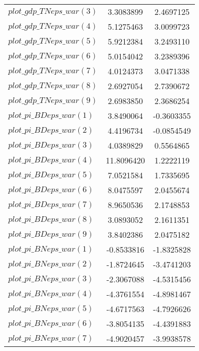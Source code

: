 \begin{center}
\begin{longtable}{lcc}
$plot\_gdp\_TN eps\_war (3)  $	 & 	      3.3083899	 & 	      2.4697125 \\ 
$plot\_gdp\_TN eps\_war (4)  $	 & 	      5.1275463	 & 	      3.0099723 \\ 
$plot\_gdp\_TN eps\_war (5)  $	 & 	      5.9212384	 & 	      3.2493110 \\ 
$plot\_gdp\_TN eps\_war (6)  $	 & 	      5.0154042	 & 	      3.2389396 \\ 
$plot\_gdp\_TN eps\_war (7)  $	 & 	      4.0124373	 & 	      3.0471338 \\ 
$plot\_gdp\_TN eps\_war (8)  $	 & 	      2.6927054	 & 	      2.7390672 \\ 
$plot\_gdp\_TN eps\_war (9)  $	 & 	      2.6983850	 & 	      2.3686254 \\ 
$plot\_pi\_BD eps\_war (1)   $	 & 	      3.8490064	 & 	     -0.3603355 \\ 
$plot\_pi\_BD eps\_war (2)   $	 & 	      4.4196734	 & 	     -0.0854549 \\ 
$plot\_pi\_BD eps\_war (3)   $	 & 	      4.0389829	 & 	      0.5564865 \\ 
$plot\_pi\_BD eps\_war (4)   $	 & 	     11.8096420	 & 	      1.2222119 \\ 
$plot\_pi\_BD eps\_war (5)   $	 & 	      7.0521584	 & 	      1.7335695 \\ 
$plot\_pi\_BD eps\_war (6)   $	 & 	      8.0475597	 & 	      2.0455674 \\ 
$plot\_pi\_BD eps\_war (7)   $	 & 	      8.9650536	 & 	      2.1748853 \\ 
$plot\_pi\_BD eps\_war (8)   $	 & 	      3.0893052	 & 	      2.1611351 \\ 
$plot\_pi\_BD eps\_war (9)   $	 & 	      3.8402386	 & 	      2.0475182 \\ 
$plot\_pi\_BN eps\_war (1)   $	 & 	     -0.8533816	 & 	     -1.8325828 \\ 
$plot\_pi\_BN eps\_war (2)   $	 & 	     -1.8724645	 & 	     -3.4741203 \\ 
$plot\_pi\_BN eps\_war (3)   $	 & 	     -2.3067088	 & 	     -4.5315456 \\ 
$plot\_pi\_BN eps\_war (4)   $	 & 	     -4.3761554	 & 	     -4.8981467 \\ 
$plot\_pi\_BN eps\_war (5)   $	 & 	     -4.6717563	 & 	     -4.7926626 \\ 
$plot\_pi\_BN eps\_war (6)   $	 & 	     -3.8054135	 & 	     -4.4391883 \\ 
$plot\_pi\_BN eps\_war (7)   $	 & 	     -4.9020457	 & 	     -3.9938578 \\ 

\end{longtable}
\end{center}
